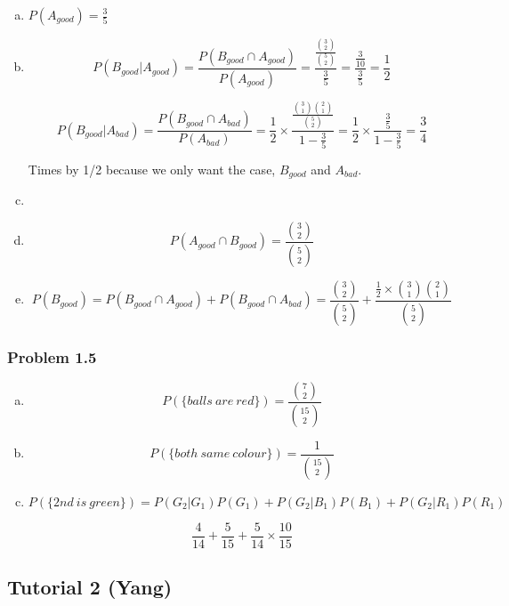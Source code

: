 \documentclass{report}
\begin{document}
\begin{enumerate}[(a)]

\item $P(A_{good}) = \frac{3}{5}$

\item $$P(B_{good} | A_{good}) = \frac{P(B_{good} \cap A_{good})}{P(A_{good})} = \frac{\frac{{3 \choose 2}}{{5 \choose 2}}}{\frac{3}{5}} = \frac{\frac{3}{10}}{\frac{3}{5}} = \frac{1}{2}$$

$$P(B_{good} | A_{bad}) = \frac{P(B_{good} \cap A_{bad})}{P(A_{bad})} = \frac{1}{2} \times \frac{\frac{{3 \choose 1}{2 \choose 1}}{{5 \choose 2}}}{1 - \frac{3}{5}} = \frac{1}{2} \times \frac{\frac{3}{5}}{1 - \frac{3}{5}} = \frac{3}{4}$$

Times by 1/2 because we only want the case, $B_{good}$ and $A_{bad}$.

\item 

\item $$P(A_{good} \cap B_{good}) = \frac{{3 \choose 2}}{{5 \choose 2}}$$

\item $$P(B_{good}) = P(B_{good} \cap A_{good}) + P(B_{good} \cap A_{bad}) = \frac{{3 \choose 2}}{{5 \choose 2}} +  \frac{\frac{1}{2} \times {3 \choose 1}{2 \choose 1}}{{5 \choose 2}}$$

\end{enumerate}

\subsubsection*{Problem 1.5}

\begin{enumerate}[(a)]

\item $$P(\{ balls\ are\ red\}) = \frac{{7 \choose 2}}{{15 \choose 2}}$$

\item $$P(\{ both\ same\ colour\}) = \frac{1}{{15 \choose 2}}$$

\item $$P(\{ 2nd\ is\ green\})  = P(G_2 | G_1)P(G_1) + P(G_2|B_1)P(B_1) + P(G_2|R_1)P(R_1)$$

$$\frac{4}{14} + \frac{5}{15} + \frac{5}{14} \times \frac{10}{15}$$

\end{enumerate}



\subsection{Tutorial 2 (Yang)}
\end{document}
